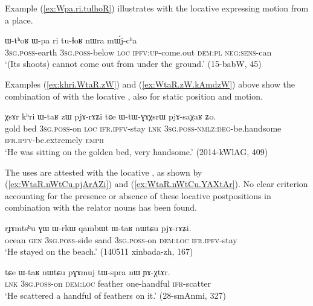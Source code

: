 Example (\ref{ex:Wpa.ri.tulhoR}) illustrates  with the locative  expressing motion from a place.

\begin{exe}
\ex \label{ex:Wpa.ri.tulhoR}
\gll ɯ-tʰoʁ ɯ-pa ri tu-ɬoʁ nɯra mɯ́j-cʰa \\
\textsc{3sg}.\textsc{poss}-earth \textsc{3sg}.\textsc{poss}-below \textsc{loc} \textsc{ipfv}:\textsc{up}-come.out \textsc{dem}:\textsc{pl} \textsc{neg}:\textsc{sens}-can \\
\glt `(Its shoots) cannot come out from under the ground.'  (15-babW, 45)
\end{exe}

Examples (\ref{ex:khri.WtaR.zW}) and (\ref{ex:WtaR.zW.kAmdzW}) above show the combination of  with the locative , also for static position and motion.

\begin{exe}
\ex \label{ex:khri.WtaR.zW}
\gll χsɤr kʰri ɯ-taʁ zɯ pjɤ-rɤʑi tɕe ɯ-tɯ-ɣɤχsrɯ pjɤ-saχaʁ ʑo. \\
gold bed \textsc{3sg}.\textsc{poss}-on \textsc{loc} \textsc{ifr}.\textsc{ipfv}-stay \textsc{lnk} \textsc{3sg}.\textsc{poss}-\textsc{nmlz}:\textsc{deg}-be.handsome \textsc{ifr}.\textsc{ipfv}-be.extremely \textsc{emph} \\
\glt `He was sitting on the golden bed, very handsome.' (2014-kWlAG, 409)
\end{exe}

The uses are attested with the locative , as shown by (\ref{ex:WtaR.nWtCu.pjArAZi}) and (\ref{ex:WtaR.nWtCu.YAXtAr}). No clear criterion accounting for the presence or absence of these locative postpositions in combination with the relator nouns has been found.

\begin{exe}
\ex \label{ex:WtaR.nWtCu.pjArAZi}
\gll  rɟɤmtsʰu ɣɯ ɯ-rkɯ qambɯt ɯ-taʁ nɯtɕu pjɤ-rɤʑi. \\
ocean \textsc{gen} \textsc{3sg}.\textsc{poss}-side sand \textsc{3sg}.\textsc{poss}-on \textsc{dem}:\textsc{loc} \textsc{ifr}.\textsc{ipfv}-stay \\
\glt `He stayed on the beach.' (140511 xinbada-zh, 167)
\end{exe}

\begin{exe}
\ex \label{ex:WtaR.nWtCu.YAXtAr}
\gll tɕe ɯ-taʁ nɯtɕu pɣɤmuj tɯ-spra nɯ ɲɤ-χtɤr. \\
\textsc{lnk} \textsc{3sg}.\textsc{poss}-on \textsc{dem}:\textsc{loc} feather one-handful \textsc{ifr}-scatter \\
\glt `He scattered a handful of feathers on it.' (28-smAnmi, 327)
\end{exe}

